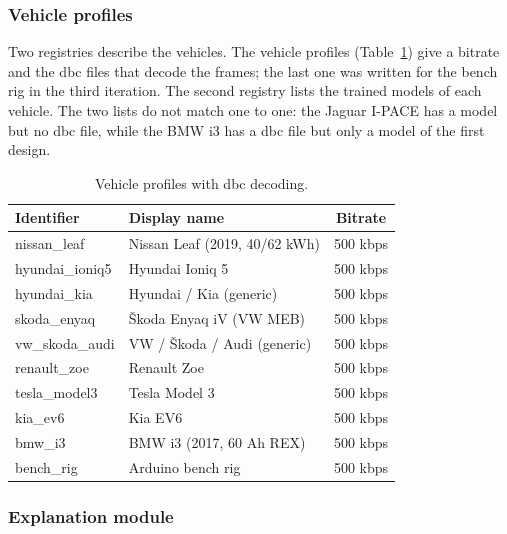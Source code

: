 \Needspace{335pt}%
\subsubsection{Vehicle profiles}
\label{sec:impl-vehicle}

Two registries describe the vehicles. The vehicle profiles (Table~\ref{tab:vehicles}) give a bitrate and the \gls{dbc} files that decode the frames; the last one was written for the bench rig in the third iteration. The second registry lists the trained models of each vehicle. The two lists do not match one to one: the Jaguar I-PACE has a model but no \gls{dbc} file, while the BMW i3 has a \gls{dbc} file but only a model of the first design.

\begin{table}[H]
\centering
\small
\caption{Vehicle profiles with \acrshort{dbc} decoding.}
\label{tab:vehicles}
\begin{tabular}{|l|l|c|}
\hline
\textbf{Identifier} & \textbf{Display name} & \textbf{Bitrate} \\
\hline
nissan\_leaf    & Nissan Leaf (2019, 40/62 kWh) & 500 kbps \\
\hline
hyundai\_ioniq5 & Hyundai Ioniq 5               & 500 kbps \\
\hline
hyundai\_kia    & Hyundai / Kia (generic)       & 500 kbps \\
\hline
skoda\_enyaq    & Škoda Enyaq iV (VW MEB)       & 500 kbps \\
\hline
vw\_skoda\_audi & VW / Škoda / Audi (generic)   & 500 kbps \\
\hline
renault\_zoe    & Renault Zoe                   & 500 kbps \\
\hline
tesla\_model3   & Tesla Model 3                 & 500 kbps \\
\hline
kia\_ev6        & Kia EV6                       & 500 kbps \\
\hline
bmw\_i3         & BMW i3 (2017, 60 Ah REX)      & 500 kbps \\
\hline
bench\_rig      & Arduino bench rig             & 500 kbps \\
\hline
\end{tabular}
\end{table}

\subsubsection{Explanation module}

